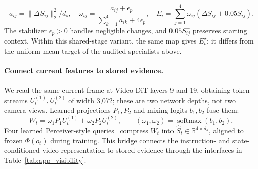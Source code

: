 \begin{equation}
 a_{ij}=\|\Delta S_{ij}\|_2^2/d_s,\quad
 \omega_{ij}=\frac{a_{ij}+\epsilon_p}{\sum_{k=1}^{4}a_{ik}+4\epsilon_p},\quad
 E_i=\sum_{j=1}^{4}\omega_{ij}(\Delta S_{ij}+0.05S^-_{ij}).
 \label{eq:effect_pooling}
\end{equation}
The stabilizer $\epsilon_p>0$ handles negligible changes, and $0.05S^-_{ij}$ preserves starting context.
Within this shared-stage variant, the same map gives $E_t^\star$; it differs from the uniform-mean target of the audited specialists above.

\paragraph{Connect current features to stored evidence.}
We read the same current frame at Video DiT layers 9 and 19, obtaining token streams $U_t^{(1)},U_t^{(2)}$ of width 3,072; these are two network depths, not two camera views.
Learned projections $P_1,P_2$ and mixing logits $b_1,b_2$ fuse them:
\begin{equation}
 W_t=\omega_1P_1U_t^{(1)}+\omega_2P_2U_t^{(2)},\qquad
 (\omega_1,\omega_2)=\operatorname{softmax}(b_1,b_2),
 \label{eq:world_fusion}
\end{equation}
Four learned Perceiver-style queries~\citep{jaegle2021perceiver} compress $W_t$ into $\widehat S_t\in\mathbb R^{4\times d_s}$, aligned to frozen $\Phi(o_t)$ during training.
This bridge connects the instruction- and state-conditioned video representation to stored evidence through the interfaces in Table~\ref{tab:app_visibility}.

